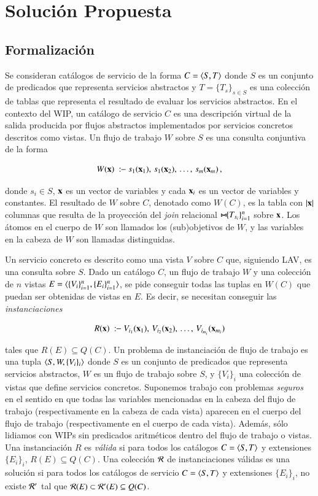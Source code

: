 \section{Solución Propuesta}

\subsection{Formalización}

Se consideran catálogos de servicio de la forma $C=\langle S,T \rangle$ donde $S$ es un
conjunto de predicados que representa servicios abstractos y $T=\{T_s\}_{s\in S}$ es una
colección de tablas que representa el resultado de evaluar los servicios
abstractos. En el contexto del WIP, un catálogo de servicio $C$ es una
descripción virtual de la salida producida por flujos abstractos
implementados por servicios concretos descritos como vistas. Un flujo de trabajo
$W$ sobre $S$ es una consulta conjuntiva de la forma

\[ W(\vvec{x})\ \qrule\ s_1(\vvec{x}_1),\,s_1(\vvec{x}_2),\,\ldots,\,s_m(\vvec{x}_m)\,, \]

donde $s_i\in S$, $\mathbf{x}$ es un vector de variables y cada $\mathbf{x}_i$ es un vector de variables y
constantes. El resultado de $W$ sobre $C$, denotado como $W(C)$, es la tabla con
 $|\mathbf{x}|$ columnas que resulta de la proyección del \emph{join} relacional
$\bowtie\!\!\{T_{s_i}\}_{i=1}^n$ sobre $\mathbf{x}$. Los átomos en el cuerpo de $W$ son llamados los
(sub)objetivos de $W$, y las variables en la cabeza de $W$ son llamadas
distinguidas.

Un servicio concreto es descrito como una vista $V$ sobre $C$ que, siguiendo
LAV, es una consulta sobre $S$. Dado un catálogo $C$, un flujo de trabajo $W$ y
una colección de $n$ vistas $E=\langle \{V_i\}_{i=1}^n,\{E_i\}_{i=1}^n \rangle$, se pide
conseguir todas las tuplas en
$W(C)$ que puedan ser obtenidas de vistas en $E$. Es decir, se necesitan
conseguir las \emph{instanciaciones}

\[ R(\vvec{x})\ \qrule\ V_{i_1}(\vvec{x}_1),\,V_{i_2}(\vvec{x}_2),\,\ldots,\,V_{i_{m_i}}(\vvec{x}_{m_i}) \]

tales que $R(E) \subseteq Q(C)$.
Un problema de instanciación de flujo de trabajo es una
tupla $\langle S,W,\{V_i\}_i \rangle$ donde $S$ es un conjunto de predicados
que representa servicios
abstractos, $W$ es un flujo de trabajo sobre $S$, y $\{V_i\}_i$ una colección de vistas
que define servicios concretos. Suponemos trabajo con problemas \emph{seguros}
en el sentido en que todas las variables mencionadas en la cabeza del flujo de
trabajo (respectivamente en la cabeza de cada vista) aparecen en el cuerpo del
flujo de trabajo (respectivamente en el cuerpo de cada vista). Además, sólo
lidiamos con WIPs sin predicados aritméticos dentro del flujo de trabajo o
vistas. Una instanciación $R$ es \emph{válida} si para todos los catálogos $C=\langle S,T \rangle$ y
extensiones $\{E_i\}_i$, $R(E)\subseteq Q(C)$. Una colección $\mathcal{R}$ de instanciaciones válidas es una
solución si para todos los catálogos de servicio $C=\langle S,T \rangle$ y extensiones $\{E_i\}_i$, no
existe $\mathcal{R}'$ tal que $\mathcal{R}(E)\subset\mathcal{R}'(E)\subseteq Q(C)$.

